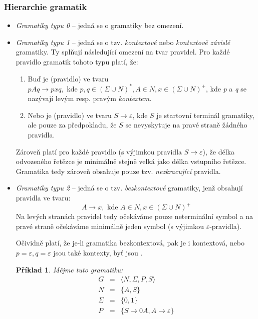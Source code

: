 \documentclass[10pt,a4paper]{article}
\theoremstyle{note}
\newtheorem{priklad}{Příklad}
\begin{document}
\subsubsection{Hierarchie gramatik}
\begin{itemize}
\item
\textit{Gramatiky typu 0} -- jedná se o gramatiky bez omezení.

\item
\textit{Gramatiky typu 1\label{gram-1}} -- jedná se o tzv. \textit{kontextové} nebo \textit{kontextově závislé} gramatiky.
Ty splňují následující omezení na tvar pravidel. Pro každé pravidlo gramatik tohoto typu platí, že:
\begin{enumerate}
\item
Buď je (pravidlo) ve tvaru $pAq \rightarrow p x q, \text{ kde } p, q \in (\Sigma \cup N)^{*}, A \in N, x \in (\Sigma \cup N)^{+}$, kde \textit{p} a \textit{q}
se nazývají levým resp. pravým \textit{kontextem}.

\item
Nebo je (pravidlo) ve tvaru $S \rightarrow \varepsilon$, kde $S$ je startovní terminál gramatiky, ale pouze
za předpokladu, že $S$ se nevyskytuje na pravé straně žádného pravidla.
\end{enumerate}

Zároveň platí pro každé pravidlo (s výjimkou pravidla $S \rightarrow \varepsilon$), že délka odvozeného řetězce je minimálně stejně velká jako délka vstupního řetězce. Gramatika tedy zároveň obsahuje pouze tzv. \textit{nezkracující} pravidla.

\item
\textit{Gramatiky typu 2} -- jedná se o tzv. \textit{bezkontextové} gramatiky, jenž obsahují pravidla ve tvaru:
$$
A \rightarrow x, \text{ kde } A \in N, x \in (\Sigma \cup N)^{+}
$$
Na levých stranách pravidel tedy očekáváme pouze neterminální symbol a na pravé straně očekáváme minimálně jeden symbol (s výjimkou $\varepsilon$-pravidla).

Očividně platí, že je-li gramatika bezkontextová, pak je i kontextová, nebo $p=\varepsilon, q=\varepsilon$ jsou také kontexty, byť jsou .

\begin{priklad}
Mějme tuto gramatiku:
\begin{eqnarray*}
G &=& \langle N, \Sigma, P, S \rangle \\
N &=& \lbrace A, S \rbrace \\
\Sigma &=& \lbrace 0, 1 \rbrace \\
P &=& \lbrace S \rightarrow 0A, A \rightarrow \varepsilon \rbrace
\end{eqnarray*}
\end{priklad}


\end{itemize}
\end{document}
